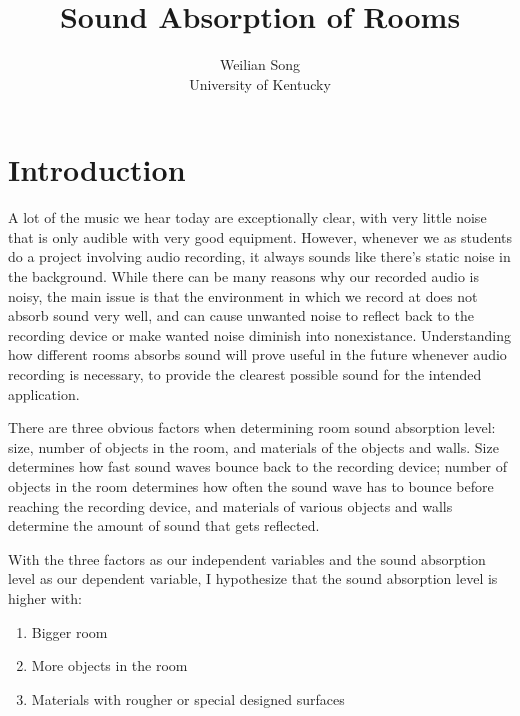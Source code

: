 \documentclass[12pt,onecolumn,letterpaper,draftclsnofoot]{article}
\begin{document}
\title{Sound Absorption of Rooms}

\author{Weilian Song\\
University of Kentucky\\
}

\maketitle

\section{Introduction}

A lot of the music we hear today are exceptionally clear, with very little
noise that is only audible with very good equipment. However, whenever we as
students do a project involving audio recording, it always sounds like there's
static noise in the background. While there can be many reasons why our
recorded audio is noisy, the main issue is that the environment in which we
record at does not absorb sound very well, and can cause unwanted noise to
reflect back to the recording device or make wanted noise diminish into
nonexistance. Understanding how different rooms absorbs sound will prove
useful in the future whenever audio recording is necessary, to provide the
clearest possible sound for the intended application.

There are three obvious factors when determining room sound absorption level:
size, number of objects in the room, and materials of the objects and walls.
Size determines how fast sound waves bounce back to the recording device;
number of objects in the room determines how often the sound wave has to
bounce before reaching the recording device, and materials of various objects
and walls determine the amount of sound that gets reflected.

With the three factors as our independent variables and the sound absorption
level as our dependent variable, I hypothesize that the sound absorption level
is higher with:

\begin{enumerate}
  \item Bigger room
  \item More objects in the room
  \item Materials with rougher or special designed surfaces
\end{enumerate}
\end{document}
